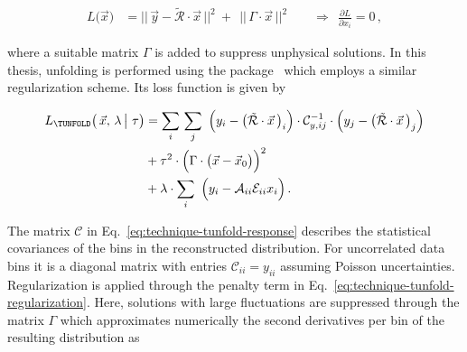 \begin{align}
L\big(\vec{x}\big)&=\big|\big|\,\vec{y}-\tilde{\mathcal{R}}\cdot\vec{x} \,\big|\big|^{2}~+~~\big|\big|\,\Gamma\cdot\vec{x}\,\big|\big|^{2}\qquad\Rightarrow~~\frac{\partial L}{\partial x_{i}}=0\,,
\end{align}

where a suitable matrix $\Gamma$ is added to suppress unphysical solutions. In this thesis, unfolding is performed using the \TUNFOLD[] package~\cite{1748-0221-7-10-T10003} which employs a similar regularization scheme. Its loss function is given by

\begin{subequations}
\begin{align}
L_\mathrm{\TUNFOLD}\big(\,\vec{x},\,\lambda\,\big|~\tau\big)&=\sum_{i}\,\sum_{j}~\Big(y_{i}-\big(\tilde{\mathcal{R}}\cdot\vec{x}\,\big)_{i}\Big)\cdot\mathcal{C}_{y,ij}^{-1}\cdot\Big(y_{j}-\big(\tilde{\mathcal{R}}\cdot\vec{x}\,\big)_{j}\Big)\label{eq:technique-tunfold-response}\\
&+\tau^{2}\cdot\Big(\Gamma\cdot\big(\vec{x}-\vec{x}_{0}\big)\Big)^{2}\label{eq:technique-tunfold-regularization}\\
&+\lambda\cdot\sum_{i}~\Big(y_{i}-\mathcal{A}_{ii}\mathcal{E}_{ii}x_{i}\Big)\,. \label{eq:technique-tunfold-efficiency}
\end{align}
\label{eq:technique-tunfold}
\end{subequations}

The matrix $\mathcal{C}$ in Eq.~\ref{eq:technique-tunfold-response} describes the statistical covariances of the bins in the reconstructed distribution. For uncorrelated data bins it is a diagonal matrix with entries $\mathcal{C}_{ii}=y_{ii}$ assuming Poisson uncertainties. Regularization is applied through the penalty term in Eq.~\ref{eq:technique-tunfold-regularization}. Here, solutions with large fluctuations are suppressed through the matrix $\Gamma$ which approximates numerically the second derivatives per bin of the resulting distribution as 

